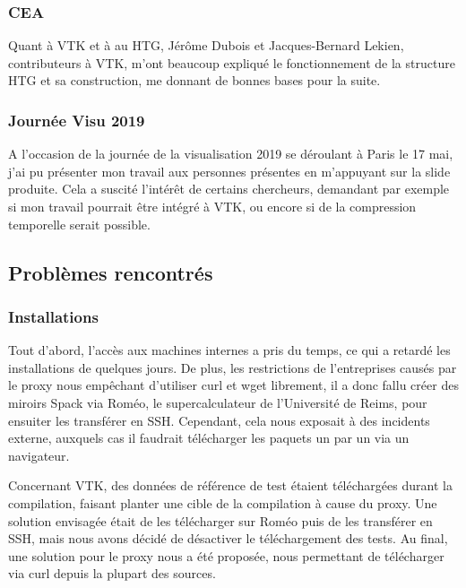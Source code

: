 \documentclass[12pt,a4paper,twoside]{article}
\begin{document}
    \subsubsection{CEA}

    Quant à VTK et à au HTG, Jérôme Dubois et Jacques-Bernard Lekien, contributeurs à VTK, m'ont beaucoup expliqué
    le fonctionnement de la structure HTG et sa construction, me donnant de bonnes bases pour la suite.

    \subsubsection{Journée Visu 2019}

    A l'occasion de la journée de la visualisation 2019 se déroulant à Paris le 17 mai, j'ai pu présenter mon travail
    aux personnes présentes en m'appuyant sur la slide produite. Cela a suscité l'intérêt de certains chercheurs,
    demandant par exemple si mon travail pourrait être intégré à VTK, ou encore si de la compression temporelle serait possible.




    \newpage
    \subsection{Problèmes rencontrés}

    \subsubsection{Installations}

    Tout d'abord, l'accès aux machines internes a pris du temps, ce qui a retardé les installations de quelques jours.
    De plus, les restrictions de l'entreprises causés par le proxy nous empêchant d'utiliser curl et wget librement, il a donc fallu créer des miroirs Spack via Roméo,
    le supercalculateur de l'Université de Reims, pour ensuiter les transférer en SSH. Cependant, cela nous exposait à des incidents externe, auxquels
    cas il faudrait télécharger les paquets un par un via un navigateur.

    Concernant VTK, des données de référence de test étaient téléchargées durant la compilation, faisant planter une cible de la compilation à cause du proxy.
    Une solution envisagée était de les télécharger sur Roméo puis de les transférer en SSH, mais nous avons décidé de désactiver le téléchargement
    des tests. Au final, une solution pour le proxy nous a été proposée, nous permettant de télécharger via curl depuis la plupart des sources.
\end{document}

